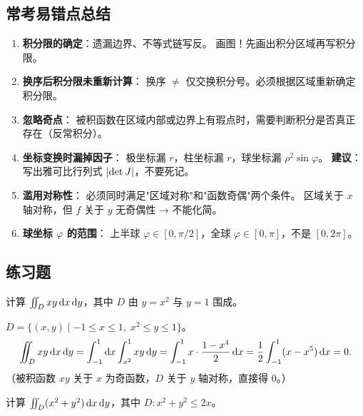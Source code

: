 \documentclass{ctexart}
\begin{document}
\subsection{常考易错点总结}

\begin{enumerate}
  \item \textbf{积分限的确定}：遗漏边界、不等式链写反。
    画图！先画出积分区域再写积分限。
  \item \textbf{换序后积分限未重新计算}：
    换序 $\ne$ 仅交换积分号。必须根据区域重新确定积分限。
  \item \textbf{忽略奇点}：
    被积函数在区域内部或边界上有瑕点时，需要判断积分是否真正存在（反常积分）。
  \item \textbf{坐标变换时漏掉因子}：
    极坐标漏 $r$，柱坐标漏 $r$，球坐标漏 $\rho^2 \sin\varphi$。
    \textbf{建议}：写出雅可比行列式 $\left| \det J \right|$，不要死记。
  \item \textbf{滥用对称性}：
    必须同时满足"区域对称"和"函数奇偶"两个条件。
    区域关于 $x$ 轴对称，但 $f$ 关于 $y$ 无奇偶性 → 不能化简。
  \item \textbf{球坐标 $\varphi$ 的范围}：
    上半球 $\varphi \in [0, \pi/2]$，全球 $\varphi \in [0, \pi]$，不是 $[0, 2\pi]$。
\end{enumerate}

\subsection{练习题}

\begin{exercise}[基本累次积分]
  计算 $\iint_D xy \,\mathrm{d} x\,\mathrm{d} y$，其中 $D$ 由 $y = x^2$ 与 $y = 1$ 围成。
\end{exercise}

\begin{solution}
  $D = \{(x,y) \mid -1 \le x \le 1,\; x^2 \le y \le 1\}$。
  \[
    \iint_D xy \,\mathrm{d} x\,\mathrm{d} y
    = \int_{-1}^{1} \mathrm{d} x \int_{x^2}^{1} xy \,\mathrm{d} y
    = \int_{-1}^{1} x \cdot \frac{1 - x^4}{2} \,\mathrm{d} x
    = \frac{1}{2} \int_{-1}^{1} (x - x^5) \,\mathrm{d} x = 0.
  \]
  （被积函数 $xy$ 关于 $x$ 为奇函数，$D$ 关于 $y$ 轴对称，直接得 $0$。）
\end{solution}

\begin{exercise}[极坐标]
  计算 $\iint_D (x^2+y^2) \,\mathrm{d} x\,\mathrm{d} y$，其中 $D: x^2+y^2 \le 2x$。
\end{exercise}
\end{document}
